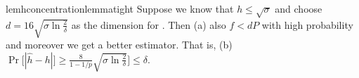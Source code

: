 



\begin{restatable}{lem}{hconcentrationlemmatight}\label{lem:hconcentrationlemmatight}
    Suppose we know that $h \le \sqrt{\sigma}$ and choose $d=16\sqrt{\sigma \ln \tfrac{2}{\delta}}$
    as the dimension for \fsketch. Then (a) also $f < dP$ with high probability and moreover we get a better estimator. That is,
    (b) $\displaystyle\Pr\big[ |\hat{h} - h | \big] \ge \tfrac{8}{1-1/p}\sqrt{\sigma\ln
    \tfrac{2}{\delta}} \big] \le \delta $.
\end{restatable}


